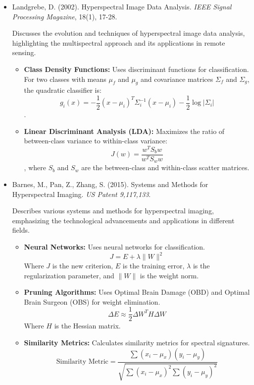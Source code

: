 \documentclass[10pt,svgnames,fragile]{beamer}
\begin{document}
\begin{frame}{}
\tiny
\begin{itemize}

    \item Landgrebe, D. (2002). Hyperspectral Image Data Analysis. \textit{IEEE Signal Processing Magazine}, 18(1), 17-28. \href{https://ieeexplore.ieee.org/document/1352410}{\color{blue}{DOI: 10.1109/79.939829}} \cite{landgrebeHyperspectralImageData2002}
    
    {\color{gray}Discusses the evolution and techniques of hyperspectral image data analysis, highlighting the multispectral approach and its applications in remote sensing.}
    \begin{itemize} \tiny
    \item \textbf{Class Density Functions:} Uses discriminant functions for classification. For two classes with means \( \mu_f \) and \( \mu_g \) and covariance matrices \( \Sigma_f \) and \( \Sigma_g \), the quadratic classifier is: \[ g_i(x) = -\frac{1}{2} (x - \mu_i)^T \Sigma_i^{-1} (x - \mu_i) - \frac{1}{2} \log |\Sigma_i| \].
    \item \textbf{Linear Discriminant Analysis (LDA):} Maximizes the ratio of between-class variance to within-class variance: \[ J(w) = \frac{w^T S_b w}{w^T S_w w} \], where \( S_b \) and \( S_w \) are the between-class and within-class scatter matrices.
\end{itemize}

\end{itemize}
\end{frame}
\begin{frame}{}
\tiny
\begin{itemize}

    \item Barnes, M., Pan, Z., Zhang, S. (2015). Systems and Methods for Hyperspectral Imaging. \textit{US Patent 9,117,133}. \href{https://patents.google.com/patent/US9117133B2/en}{\color{blue}{DOI: 10.1109/TGRS.2015.2421060}}
    
    {\color{gray}Describes various systems and methods for hyperspectral imaging, emphasizing the technological advancements and applications in different fields.}
    \begin{itemize} \tiny
    \item \textbf{Neural Networks:} Uses neural networks for classification.
    \[
    J = E + \lambda \|W\|^2
    \]
    Where \( J \) is the new criterion, \( E \) is the training error, \( \lambda \) is the regularization parameter, and \( \|W\| \) is the weight norm.
    \item \textbf{Pruning Algorithms:} Uses Optimal Brain Damage (OBD) and Optimal Brain Surgeon (OBS) for weight elimination.
    \[
    \Delta E \approx \frac{1}{2} \Delta W^T H \Delta W
    \]
    Where \( H \) is the Hessian matrix.
    \item \textbf{Similarity Metrics:} Calculates similarity metrics for spectral signatures.
    \[
    \text{Similarity Metric} = \frac{\sum (x_i - \mu_x)(y_i - \mu_y)}{\sqrt{\sum (x_i - \mu_x)^2 \sum (y_i - \mu_y)^2}}
    \]
\end{itemize}

\end{itemize}
\end{frame}
\end{document}
